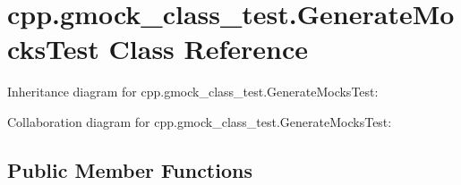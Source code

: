 \hypertarget{classcpp_1_1gmock__class__test_1_1GenerateMocksTest}{}\section{cpp.\+gmock\+\_\+class\+\_\+test.\+Generate\+Mocks\+Test Class Reference}
\label{classcpp_1_1gmock__class__test_1_1GenerateMocksTest}


Inheritance diagram for cpp.\+gmock\+\_\+class\+\_\+test.\+Generate\+Mocks\+Test\+:


Collaboration diagram for cpp.\+gmock\+\_\+class\+\_\+test.\+Generate\+Mocks\+Test\+:
\subsection*{Public Member Functions}
